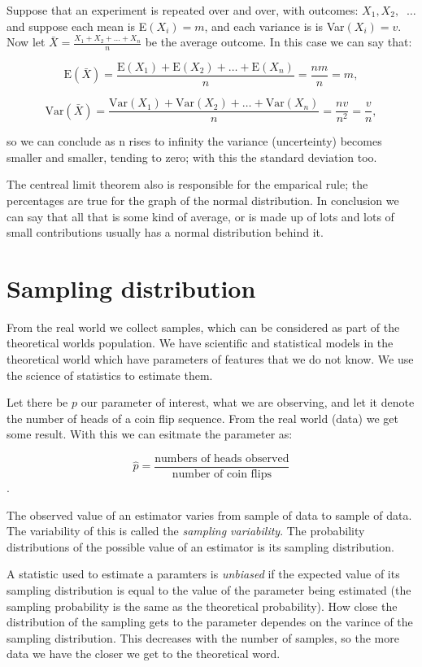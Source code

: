 Suppose that an experiment is repeated over and over, with outcomes: $X_1, X_2,
$ $~\ldots$ and suppose each mean is E$(X_i) = m$, and each variance is is
Var$(X_i)=v$. Now let $\bar{X} = \frac{X_1 + X_2 +\ldots + X_n}{n}$ be the
average outcome. In this case we can say that:

\[ \mbox{E}(\bar{X}) = \frac{\mbox{E}(X_1) + \mbox{E}(X_2) + \ldots +
\mbox{E}(X_n)}{n} = \frac{nm}{n} = m,\]

\[ \mbox{Var}(\bar{X}) = \frac{\mbox{Var}(X_1) + \mbox{Var}(X_2) + \ldots +
\mbox{Var}(X_n)}{n} = \frac{nv}{n^2} = \frac{v}{n},\]

so we can conclude as n rises to infinity the variance (uncerteinty) becomes
smaller and smaller, tending to zero; with this the standard deviation too.

The centreal limit theorem also is responsible for the emparical rule; the
percentages are true for the graph of the normal distribution. In conclusion we
can say that all that is some kind of average, or is made up of lots and lots of
small contributions usually has a normal distribution behind it.

\section{Sampling distribution}

From the real world we collect samples, which can be considered as part of the
theoretical worlds population. We have scientific and statistical models in the
theoretical world which have parameters of features that we do not know. We use
the science of statistics to estimate them.

Let there be $p$ our parameter of interest, what we are observing, and let it
denote the number of heads of a coin flip sequence. From the real world (data)
we get some result. With this we can esitmate the parameter as:

 \[ \hat{p} = \frac{\mbox{numbers of heads observed}}{\mbox{number of coin
 flips}}\].
 
 The observed value of an estimator varies from sample of data to sample of
 data. The variability of this is called the \emph{sampling variability}. The
 probability distributions of the possible value of an estimator is its sampling
 distribution.
 
 A statistic used to estimate a paramters is \emph{unbiased} if the expected
 value of its sampling distribution is equal to the value of the parameter being
 estimated (the sampling probability is the same as the theoretical
 probability). How close the distribution of the sampling gets to the parameter
 dependes on the varince of the sampling distribution. This decreases with the
 number of samples, so the more data we have the closer we get to the
 theoretical word.
 
